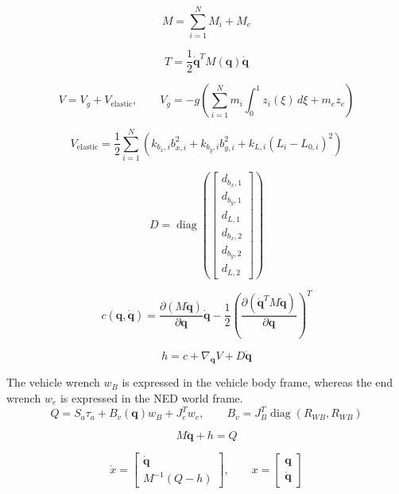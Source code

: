 \documentclass[11pt]{article}
\begin{document}
\begin{equation}
M=\sum_{i=1}^{N}M_i+M_e\label{eq:mass-assembly}
\end{equation}

\begin{equation}
T=\frac12\dot{\boldsymbol q}^{T}M(\boldsymbol q)\dot{\boldsymbol q}
\end{equation}

\begin{equation}
V=V_g+V_{\mathrm{elastic}},\qquad V_g=-g\!\left(\sum_{i=1}^{N}m_i\int_0^1z_i(\xi)\,d\xi+m_ez_e\right)
\end{equation}

\begin{equation}
V_{\mathrm{elastic}}=\frac12\sum_{i=1}^{N}\left(k_{b_x,i}b_{x,i}^{2}+k_{b_y,i}b_{y,i}^{2}+k_{L,i}(L_i-L_{0,i})^2\right)
\end{equation}

\begin{equation}
D=\operatorname{diag}\!\left(\begin{bmatrix}d_{b_x,1}\\d_{b_y,1}\\d_{L,1}\\d_{b_x,2}\\d_{b_y,2}\\d_{L,2}\end{bmatrix}\right)
\end{equation}

\begin{equation}
c(\boldsymbol q,\dot{\boldsymbol q})=\frac{\partial(M\dot{\boldsymbol q})}{\partial\boldsymbol q}\dot{\boldsymbol q}-\frac12\left(\frac{\partial(\dot{\boldsymbol q}^{T}M\dot{\boldsymbol q})}{\partial\boldsymbol q}\right)^T
\end{equation}

\begin{equation}
h=c+\nabla_{\boldsymbol q}V+D\dot{\boldsymbol q}
\end{equation}

The vehicle wrench $w_B$ is expressed in the vehicle body frame, whereas the end wrench $w_e$ is expressed in the NED world frame.
\begin{equation}
Q=S_a\tau_a+B_v(\boldsymbol q)w_B+J_e^Tw_e,\qquad B_v=J_B^T\operatorname{diag}(R_{WB},R_{WB})
\end{equation}

\begin{equation}
M\ddot{\boldsymbol q}+h=Q\label{eq:dynamics}
\end{equation}

\begin{equation}
\dot x=\begin{bmatrix}\dot{\boldsymbol q}\\M^{-1}(Q-h)\end{bmatrix},\qquad x=\begin{bmatrix}\boldsymbol q\\\dot{\boldsymbol q}\end{bmatrix}
\end{equation}
\end{document}
